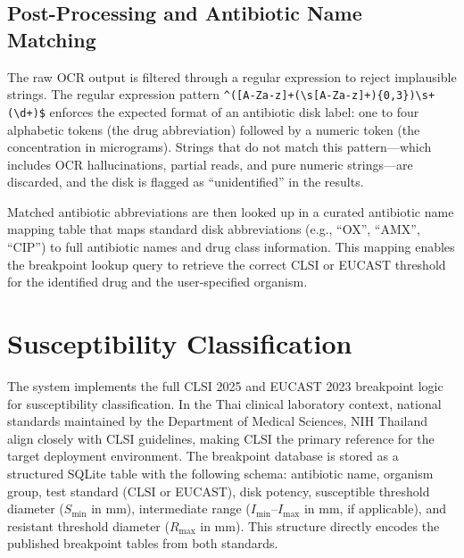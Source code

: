 \subsection{Post-Processing and Antibiotic Name Matching}

The raw OCR output is filtered through a regular expression to reject implausible strings.
The regular expression pattern \texttt{\^{}([A-Za-z]+(\textbackslash{}s[A-Za-z]+)\{0,3\})\textbackslash{}s+(\textbackslash{}d+)\$}
enforces the expected format of an antibiotic disk label: one to four alphabetic tokens
(the drug abbreviation) followed by a numeric token (the concentration in micrograms). Strings
that do not match this pattern---which includes OCR hallucinations, partial reads, and pure
numeric strings---are discarded, and the disk is flagged as ``unidentified'' in the results.

Matched antibiotic abbreviations are then looked up in a curated antibiotic name mapping
table that maps standard disk abbreviations (e.g., ``OX'', ``AMX'', ``CIP'') to full antibiotic
names and drug class information. This mapping enables the breakpoint lookup query to retrieve
the correct CLSI or EUCAST threshold for the identified drug and the user-specified organism.

\section{Susceptibility Classification}

The system implements the full CLSI 2025 \cite{clsi2025} and EUCAST 2023 \cite{eucast2023}
breakpoint logic for susceptibility classification. In the Thai clinical laboratory context,
national standards maintained by the Department of Medical Sciences, NIH Thailand
\cite{dmsc_nih} align closely with CLSI guidelines, making CLSI the primary reference for
the target deployment environment. The breakpoint database is stored as a structured SQLite
table with the following schema: antibiotic name, organism group, test standard (CLSI or EUCAST),
disk potency, susceptible threshold diameter ($S_{\min}$ in mm), intermediate range
($I_{\min}$--$I_{\max}$ in mm, if applicable), and resistant threshold diameter ($R_{\max}$ in mm).
This structure directly encodes the published breakpoint tables from both standards.


